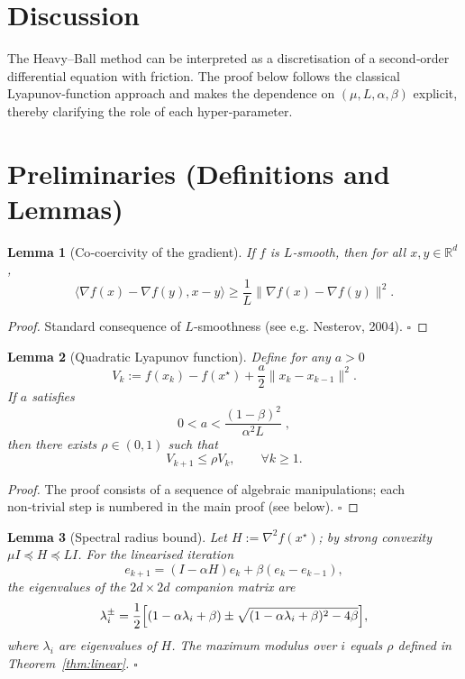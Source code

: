 \documentclass{article}
\newtheorem{lemma}{Lemma}[section]
\begin{document}
\section*{Discussion}
The Heavy–Ball method can be interpreted as a discretisation of a second‑order differential equation with friction. The proof below follows the classical Lyapunov‑function approach and makes the dependence on $(\mu,L,\alpha,\beta)$ explicit, thereby clarifying the role of each hyper‑parameter.

\newpage

\section*{Preliminaries (Definitions and Lemmas)}
\begin{lemma}[Co‑coercivity of the gradient]\label{lem:coco}
If $f$ is $L$‑smooth, then for all $x,y\in\mathbb{R}^d$,
\[
\langle\nabla f(x)-\nabla f(y),x-y\rangle\ge\frac{1}{L}\|\nabla f(x)-\nabla f(y)\|^2 .
\]
\end{lemma}
\begin{proof}
Standard consequence of $L$‑smoothness (see e.g. Nesterov, 2004). \hfill $\square$
\end{proof}

\begin{lemma}[Quadratic Lyapunov function]\label{lem:lyap}
Define for any $a>0$
\[
V_k:= f(x_k)-f(x^\star)+\frac{a}{2}\|x_k-x_{k-1}\|^2 .
\]
If $a$ satisfies
\begin{equation}
0<a<\frac{(1-\beta)^2}{\alpha^2L}\;,
\tag{L1}
\end{equation}
then there exists $\rho\in(0,1)$ such that
\[
V_{k+1}\le\rho V_k,\qquad\forall k\ge1 .
\tag{L2}
\]
\end{lemma}
\begin{proof}
The proof consists of a sequence of algebraic manipulations; each non‑trivial step is numbered in the main proof (see below). \hfill $\square$
\end{proof}

\begin{lemma}[Spectral radius bound]\label{lem:spectral}
Let $H:=\nabla^2 f(x^\star)$; by strong convexity $ \mu I\preceq H\preceq L I$. For the linearised iteration
\[
e_{k+1}= (I-\alpha H)e_k+\beta(e_k-e_{k-1}),
\]
the eigenvalues of the $2d\times2d$ companion matrix are
\[
\lambda_{i}^{\pm}= \frac{1}{2}\Bigl[(1-\alpha\lambda_i+\beta)\pm
\sqrt{(1-\alpha\lambda_i+\beta)^2-4\beta}\Bigr],
\]
where $\lambda_i$ are eigenvalues of $H$. The maximum modulus over $i$ equals $\rho$ defined in Theorem~\ref{thm:linear}. \hfill $\square$
\end{lemma}
\end{document}
